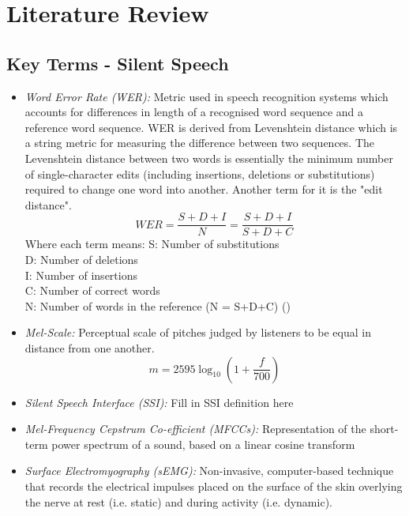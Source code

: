 \iffalse
Mark Scheme:
- Extensive Research
- Understanding of complex subject matter
- Identifies flaws, gaps or inconsistencies in extant knowledge
\fi

\iffalse

Mu-Law compression:
- compresses audio signal into discrete bins whilst preserving dynamic range

Current sEMG Silent Speech Text Classification Research:
- https://dspace.mit.edu/bitstream/handle/1721.1/123121/1128187233-MIT.pdf?sequence=1&isAllowed=y

\fi

\chapter{Literature Review} \label{chap:lit-review}

\section{Key Terms - Silent Speech}

\begin{itemize}
  \item \emph{Word Error Rate (WER):}
  Metric used in speech recognition systems which accounts for differences in length of
  a recognised word sequence and a reference word sequence. WER is derived from
  Levenshtein distance  which is a string metric for measuring the difference between two
  sequences. The Levenshtein distance between two words is essentially the minimum number of
  single-character edits (including insertions, deletions or substitutions) required to
  change one word into another. Another term for it is the "edit distance".
  \[
    WER
    = \dfrac{S + D + I}{N}
    = \dfrac{S + D + I}{S + D + C}
  \]
  Where each term means:
  S: Number of substitutions\\
  D: Number of deletions\\
  I: Number of insertions\\
  C: Number of correct words\\
  N: Number of words in the reference (N = S+D+C)
  (\cite{1966SPhD...10..707L})
  \item \emph{Mel-Scale:}
  Perceptual scale of pitches judged by listeners to be equal in distance from one another.
  \[ m = 2595 \log_{10} \left(1 + \dfrac{f}{700}\right) \]
  \item \emph{Silent Speech Interface (SSI):}
  Fill in SSI definition here
  \item \emph{Mel-Frequency Cepstrum Co-efficient (MFCCs):}
  Representation of the short-term power spectrum of a sound, based on a linear cosine transform
  \item \emph{Surface Electromyography (sEMG):}
  Non-invasive, computer-based technique that records the electrical impulses placed on the surface
  of the skin overlying the nerve at rest (i.e. static) and during activity (i.e. dynamic).
\end{itemize}

